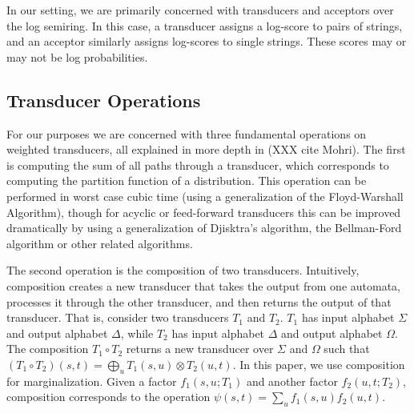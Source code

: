 \documentclass[11pt,a4paper]{article}
\begin{document}

In our setting, we are primarily concerned with transducers and
acceptors over the log semiring. In this case, a transducer assigns
a log-score to pairs of strings, and an acceptor similarly assigns
log-scores to single strings. These scores may or may not be
log probabilities.

\subsection{Transducer Operations}

For our purposes we are concerned with three fundamental operations
on weighted transducers, all explained in more depth in (XXX cite
Mohri). The first is computing the sum of all paths through a
transducer, which corresponds to computing the partition function
of a distribution. This operation can be performed in worst case
cubic time (using a generalization of the Floyd-Warshall Algorithm),
though for acyclic or feed-forward transducers this can be improved
dramatically by using a generalization of Djisktra's algorithm, the
Bellman-Ford algorithm or other related algorithms.

The second operation is the composition of two transducers. Intuitively,
composition creates a new transducer that takes the output from one
automata, processes it through the other transducer, and then returns
the output of that transducer. That is, consider two transducers
$T_1$ and $T_2$. $T_1$ has input alphabet $\Sigma$ and output
alphabet $\Delta$, while $T_2$ has input alphabet $\Delta$ and
output alphabet $\Omega$. The composition $T_1 \circ T_2$ returns
a new transducer over $\Sigma$ and $\Omega$ such that $(T_1 \circ
T_2)(s,t) = \bigoplus_{u} T_1(s,u)\otimes T_2(u,t)$. In this paper,
we use composition for marginalization. Given a factor $f_1(s,u;T_1)$
and another factor $f_2(u,t;T_2)$, composition corresponds to the
operation $\psi(s,t) = \sum_u f_1(s,u) f_2(u,t)$.
\end{document}
